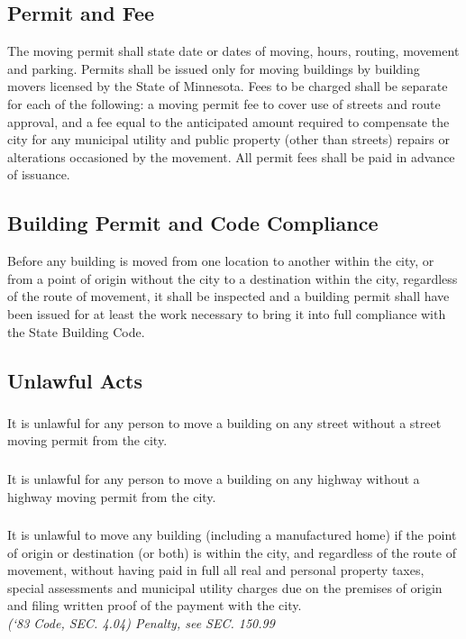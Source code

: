 \subsection{Permit and Fee}
The moving permit shall state date or dates of moving, hours, routing, movement and parking. Permits shall be issued only for moving buildings by building movers licensed by the State of Minnesota. Fees to be charged shall be separate for each of the following: a moving permit fee to cover use of streets and route approval, and a fee equal to the anticipated amount required to compensate the city for any municipal utility and public property (other than streets) repairs or alterations occasioned by the movement. All permit fees shall be paid in advance of issuance.
\subsection{Building Permit and Code Compliance}
Before any building is moved from one location to another within the city, or from a point of origin without the city to a destination within the city, regardless of the route of movement, it shall be inspected and a building permit shall have been issued for at least the work necessary to bring it into full compliance with the State Building Code.
\subsection{Unlawful Acts}
\subsubsection{}
It is unlawful for any person to move a building on any street without a street moving permit from the city.
\subsubsection{}
It is unlawful for any person to move a building on any highway without a highway moving permit from the city.
\subsubsection{}
It is unlawful to move any building (including a manufactured home) if the point of origin or destination (or both) is within the city, and regardless of the route of movement, without having paid in full all real and personal property taxes, special assessments and municipal utility charges due on the premises of origin and filing written proof of the payment with the city.\\
\emph{(‘83 Code, SEC. 4.04)  Penalty, see SEC. 150.99}
